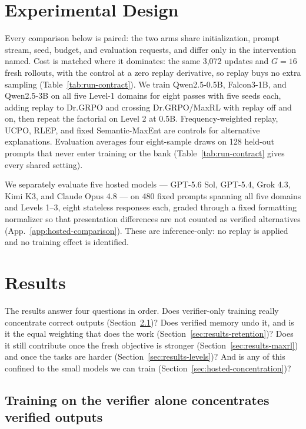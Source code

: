 \documentclass{article}
\newcommand{\1}{\mathbf 1}
\theoremstyle{remark}
\theoremstyle{definition}
\theoremstyle{plain}
\begin{document}
\section{Experimental Design}
\label{sec:experiments}
\label{sec:shared-protocol}

Every comparison below is paired: the two arms share initialization, prompt
stream, seed, budget, and evaluation requests, and differ only in the
intervention named. Cost is matched where it dominates: the same 3,072
updates and $G=16$ fresh rollouts, with the control at a zero replay derivative,
so replay buys no extra sampling (Table~\ref{tab:run-contract}).
\label{sec:retention-design}%
\label{sec:factorial-design}%
We train Qwen2.5-0.5B, Falcon3-1B, and Qwen2.5-3B on all five Level-1 domains
for eight passes with five seeds each, adding replay to Dr.GRPO and crossing
Dr.GRPO/MaxRL with replay off and on, then repeat the factorial on Level 2 at
0.5B. Frequency-weighted replay, UCPO, RLEP, and fixed Semantic-MaxEnt are
controls for alternative explanations. Evaluation averages four eight-sample
draws on 128 held-out prompts that never enter training or the bank
(Table~\ref{tab:run-contract} gives every shared setting).

We separately evaluate five hosted models --- GPT-5.6 Sol, GPT-5.4, Grok 4.3,
Kimi K3, and Claude Opus 4.8 --- on 480 fixed prompts spanning all five domains
and Levels 1--3, eight stateless responses each, graded through a fixed
formatting normalizer so that presentation differences are not counted as
verified alternatives (App.~\ref{app:hosted-comparison}). These are
inference-only: no replay is applied and no training effect is identified.

\section{Results}
\label{sec:results}

The results answer four questions in order. Does verifier-only training really
concentrate correct outputs (Section~\ref{sec:results-collapse})? Does verified
memory undo it, and is it the equal weighting that does the work
(Section~\ref{sec:results-retention})? Does it still contribute once the fresh
objective is stronger (Section~\ref{sec:results-maxrl}) and once the tasks are
harder (Section~\ref{sec:results-levels})? And is any of this confined to the
small models we can train (Section~\ref{sec:hosted-concentration})?

\subsection{Training on the verifier alone concentrates verified outputs}
\label{sec:results-collapse}
\end{document}
